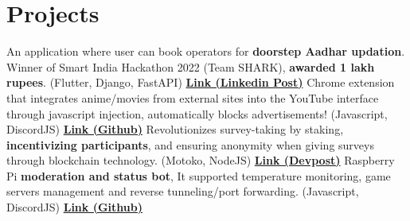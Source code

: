 \section{Projects}
  \resumeSubHeadingListStart
      {An application where user can book operators for \textbf{doorstep Aadhar updation}. Winner of Smart India Hackathon 2022 (Team SHARK), \textbf{awarded 1 lakh rupees}. (Flutter, Django, FastAPI) \href{https://www.linkedin.com/posts/hsk4link_sih-sih2022-smartindiahackathon-activity-6970324738409672704-YcQA/}{\textbf{Link (Linkedin Post)}}}
      {Chrome extension that integrates anime/movies from external sites into the YouTube interface through javascript injection, automatically blocks advertisements! (Javascript, DiscordJS) \href{https://github.com/hari01584/many-more-yt-extender}{\textbf{Link (Github)}}}
      {Revolutionizes survey-taking by staking, \textbf{incentivizing participants}, and ensuring anonymity when giving surveys through blockchain technology. (Motoko, NodeJS) \href{https://devpost.com/software/desu-decentralised-survey-app}{\textbf{Link (Devpost)}}}
      {Raspberry Pi \textbf{moderation and status bot}, It supported temperature monitoring, game servers management and reverse tunneling/port forwarding. (Javascript, DiscordJS) \href{https://github.com/hari01584/RaspMyBerry}{\textbf{Link (Github)}}}
  \resumeSubHeadingListEnd